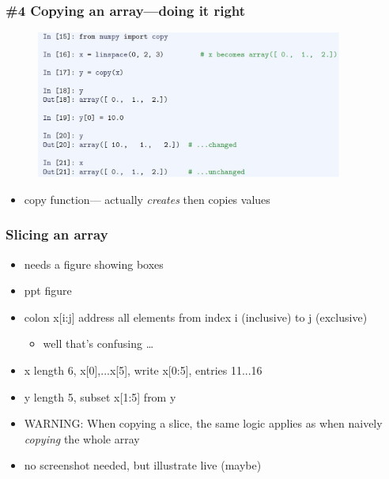 \documentclass[14pt]{beamer}
\begin{document}
\begin{frame}[fragile]

\frametitle{\#4 Copying an array---doing it right}

\begin{figure}[ht]
	\centering
	\includegraphics[width=0.9\textwidth]{figures/LLp51a}
\end{figure}

\vspace*{-5mm}

\begin{itemize}
	\item copy function--- actually \emph{creates} then copies values
\end{itemize}

\end{frame}


\begin{frame}[fragile]

\frametitle{Slicing an array}

\begin{itemize}
	\item needs a figure showing boxes
	\item ppt figure
	\item colon x[i:j] address all elements from index i (inclusive) to j (exclusive)
		\begin{itemize}
			\item well that's confusing \ldots
		\end{itemize}
	\item x length 6, x[0],...x[5], write x[0:5], entries 11...16
	\item y length 5, subset x[1:5]  from y
	\item WARNING: When copying a slice, the same logic applies as when naively \emph{copying} the whole array
	\item no screenshot needed, but illustrate live (maybe)
\end{itemize}

\end{frame}
\end{document}

